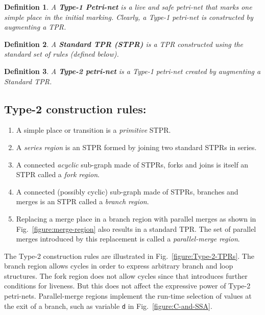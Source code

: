\documentclass[conference]{IEEEtran}
\newtheorem{definition}{Definition}[section]
\begin{document}
\begin{definition} A {\bf Type-1 Petri-net} is a live and safe
petri-net that marks one simple place in the initial marking. Clearly,
a Type-1 petri-net is constructed by augmenting a TPR.
\end{definition}

\begin{definition}
A {\bf Standard TPR (STPR)} is a TPR constructed using the standard
set of rules (defined below).
\end{definition}

\begin{definition} A {\bf Type-2 petri-net} is a Type-1 petri-net
created by augmenting a Standard TPR.
\end{definition}

\subsection*{Type-2 construction rules:}

\begin{enumerate}
  \item A simple place or transition is a {\em primitive} STPR.

  \item A {\em series region} is an STPR formed by joining two
        standard STPRs in series.

  \item A connected {\it acyclic} sub-graph made of STPRs, forks and
        joins is itself an STPR called a {\em fork region}.

  \item A connected (possibly cyclic) sub-graph made of STPRs, branches
        and merges is an STPR called a {\em branch region}.

  \item Replacing a merge place in a branch region with parallel
        merges as shown in Fig.~\ref{figure:merge-region} also
        results in a standard TPR. The set of parallel merges
        introduced by this replacement is called a {\em parallel-merge
        region}.
\end{enumerate}

The Type-2 construction rules are illustrated in
Fig.~\ref{figure:Type-2-TPRs}. The branch region allows cycles in
order to express arbitrary branch and loop structures. The fork region
does not allow cycles since that introduces further conditions for
liveness. But this does not affect the expressive power of Type-2
petri-nets. Parallel-merge regions implement the run-time selection of
values at the exit of a branch, such as variable {\tt d} in
Fig.~\ref{figure:C-and-SSA}.
\end{document}
